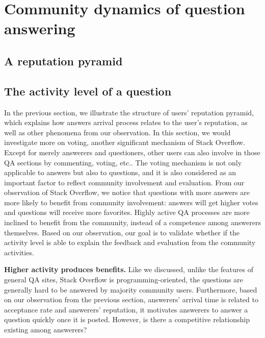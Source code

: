 \section{Community dynamics of question answering}

\subsection{A reputation pyramid}

\subsection{The activity level of a question}
In the previous section, we illustrate the structure of users' reputation pyramid, which explains how answers arrival process relates to the user's reputation, as well as other phenomena from our observation. In this section, we would investigate more on voting, another significant mechanism of Stack Overflow. Except for merely answerers and questioners, other users can also involve in those QA sections by commenting, voting, etc.. The voting mechanism is not only applicable to answers but also to questions, and it is also considered as an important factor to reflect community involvement and evaluation. From our observation of Stack Overflow, we notice that questions with more answers are more likely to benefit from community involvement: answers will get higher votes and questions will receive more favorites. Highly active QA processes are more inclined to benefit from the community, instead of a competence among answerers themselves.  Based on our observation, our goal is to validate whether if the activity level is able to explain the feedback and evaluation from the community activities.

\textbf{Higher activity produces benefits.}
Like we discussed, unlike the features of general QA sites, Stack Overflow is programming-oriented, the questions are generally hard to be answered by majority community users. Furthermore, based on our observation from the previous section, answerers' arrival time is related to acceptance rate and answerers' reputation, it motivates answerers to answer a question quickly once it is posted. However, is there a competitive relationship existing among answerers?


